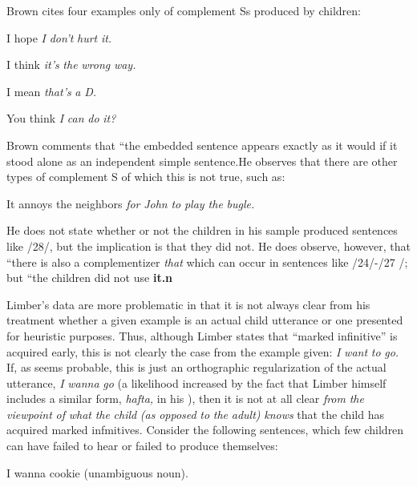 
Brown cites four examples only of complement Ss produced by children:

\ea\label{ex:24}
 I hope \textit{I} \textit{don't} \textit{hurt} \textit{it.}
\glt
\z

\ea\label{ex:25}
 I think \textit{it's} \textit{the} \textit{wrong} \textit{way.}
\glt
\z

\ea\label{ex:26}
 I mean \textit{that's} \textit{a} \textit{D.}
\glt
\z

\ea\label{ex:27}
 You think \textit{I} \textit{can} \textit{do} \textit{it?}
\glt
\z

Brown comments that ``the embedded sentence appears exactly as it would if it stood alone as an independent simple sentence.{\textquotedbl}He observes that there are other types of complement S of which this is not true, such as:

\ea\label{ex:28}
 It annoys the neighbors \textit{for} \textit{John} \textit{to} \textit{play the} \textit{bugle.}
\glt
\z

He does not state whether or not the children in his sample produced sentences like /28/, but the implication is that they did not. He does observe, however, that ``there is also a complementizer \textit{that{\textquotedbl}} which can occur in sentences like /24/-/27 /; but ``the children did not use \textbf{it.n}

Limber's data are more problematic in that it is not always clear from his treatment whether a given example is an actual child utterance or one presented for heuristic purposes. Thus, although Limber states that ``marked infinitive'' is acquired early, this is not clearly the case from the example given: \textit{I} \textit{want} \textit{to} \textit{go.} If, as seems probable, this is just an orthographic regularization of the actual utterance, \textit{I} \textit{wanna} \textit{go} (a likelihood increased by the fact that Limber himself includes a similar form, \textit{h}\textit{a}\textit{fta,} in his ), then it is not at all clear \textit{from} \textit{the} \textit{viewpoint} \textit{of} \textit{what} \textit{the} \textit{child }\textit{(as} \textit{opposed} \textit{to} \textit{the} \textit{adult)} \textit{knows} that the child has acquired marked infmitives. Consider the following sentences, which few children can have failed to hear or failed to produce themselves:

\ea\label{ex:29}
 I wanna cookie (unambiguous noun).
\glt
\z

